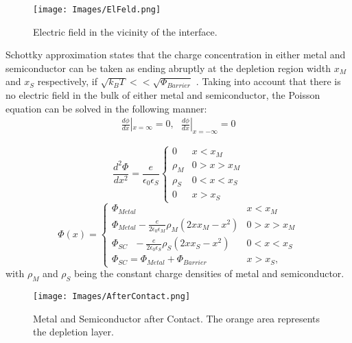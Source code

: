\documentclass[12pt]{article}
\begin{document}
\begin{figure}[hb]
	\centering
		\texttt{[image: Images/ElFeld.png]}
	\caption{Electric field in the vicinity of the interface.}
	\label{fig:ElFeld}
\end{figure}

Schottky approximation states that the charge concentration in either metal and semiconductor can be taken as ending abruptly at the depletion region width $x_M$ and $x_S$ respectively, if \( \sqrt{k_B T} << \sqrt{\Phi_{Barrier}} \) \cite{Fundamentals}. Taking into account that there is no electric field in the bulk of either metal and semiconductor, the Poisson equation can be solved in the following manner:
\begin{align*}
\frac{d \phi}{dx} | _{x = \infty} = 0, \ \ \
\frac{d \phi}{dx} | _{x = -\infty} = 0
\end{align*}

\begin{equation}
\frac{d^2 \Phi}{dx^2} = \frac{e}{\epsilon _0 \epsilon _S}
\begin{cases}
0		 			 & \text{$x < x_M$} \\ 
\rho _M		 & \text{$0 > x > x_M$} \\   
\rho _S    & \text{$0 < x < x_S$} \\ 
0		 			 & \text{$x > x_S$}
\end{cases}
\end{equation}
\begin{equation}
\Phi (x) =
\begin{cases}
\Phi _{Metal}		 			 									& \text{$x < x_M$} \\ 
\Phi _{Metal}	- \frac{e}{2 \epsilon _0 \epsilon _M} \rho _M (2xx_M - x^2 )		 & \text{$0 > x > x_M$} \\
\Phi _{SC}\ \ \ - \frac{e}{2 \epsilon _0 \epsilon _S} \rho _S (2xx_S - x^2 )     & \text{$0 < x < x_S$} \\ 
\Phi _{SC} = \Phi _{Metal} + \Phi_{Barrier}			 			  & \text{$x > x_S$},
\end{cases}
\end{equation}
with $\rho _M$ and $\rho _S$ being the constant charge densities of metal and semiconductor\cite{Fundamentals}.

\begin{figure}[htb]
	\centering
		\texttt{[image: Images/AfterContact.png]}
	\caption{Metal and Semiconductor after Contact. The orange area represents the depletion layer.}
	\label{fig:AfterContact}
\end{figure}
\end{document}
